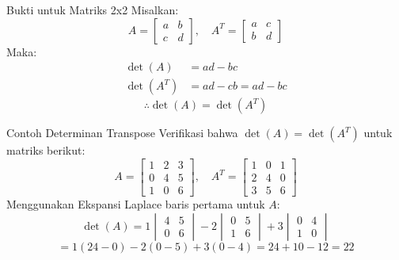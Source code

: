 \documentclass{beamer}
\begin{document}
\begin{frame}[t,fragile]{Bukti untuk Matriks 2x2}
Misalkan:
$$ A = \begin{bmatrix}
       	a & b \\
	    c & d
        \end{bmatrix}, \quad A^T = \begin{bmatrix}
       	a & c \\
	    b & d
        \end{bmatrix} $$
Maka:
\begin{align*}
\det(A) &= ad - bc \\
\det(A^T) &= ad - cb = ad - bc
\end{align*}
$$ \therefore \det(A) = \det(A^T) $$
\end{frame}

\begin{frame}[t,fragile]{Contoh Determinan Transpose}
Verifikasi bahwa $\det(A) = \det(A^T)$ untuk matriks berikut:
$$ A = \begin{bmatrix}
       	1 & 2 & 3 \\
	    0 & 4 & 5 \\
	    1 & 0 & 6
        \end{bmatrix}, \quad A^T = \begin{bmatrix}
       	1 & 0 & 1 \\
	    2 & 4 & 0 \\
	    3 & 5 & 6
        \end{bmatrix} $$
Menggunakan Ekspansi Laplace baris pertama untuk $A$:
$$ \det(A) = 1 \begin{vmatrix} 4 & 5 \\ 0 & 6 \end{vmatrix} - 2 \begin{vmatrix} 0 & 5 \\ 1 & 6 \end{vmatrix} + 3 \begin{vmatrix} 0 & 4 \\ 1 & 0 \end{vmatrix} $$
$$ = 1(24 - 0) - 2(0 - 5) + 3(0 - 4) = 24 + 10 - 12 = 22 $$
\end{frame}
\end{document}
